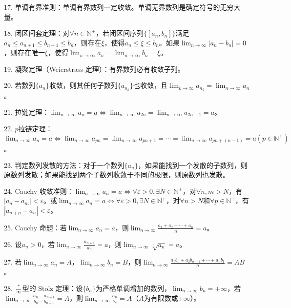 \documentclass[UTF8]{ctexart}
\theoremstyle{remark}
\begin{document}
	17. 单调有界准则：单调有界数列一定收敛。单调无界数列是确定符号的无穷大量。
	
	18. 闭区间套定理：对\(\forall n\in\mathbb{N}^+\)，若闭区间序列\(\{[a_n,b_n]\}\)满足\(a_n\leq a_{n + 1}\leq b_{n + 1}\leq b_n\)，则存在\(\xi\)，使得\(a_n\leq\xi\leq b_n\)。如果\(\lim_{n\rightarrow\infty}|a_n - b_n| = 0\)，则存在唯一\(\xi\)，使得\(\lim_{n\rightarrow\infty}a_n = \lim_{n\rightarrow\infty}b_n = \xi\)。
	
	19. 凝聚定理（Weierstrass 定理）：有界数列必有收敛子列。
	
	20. 若数列\(\{a_n\}\)收敛，则其任何子数列\(\{a_{n_k}\}\)也收敛，且\(\lim_{k\rightarrow\infty}a_{n_k} = \lim_{n\rightarrow\infty}a_n\)。
	
	21. 拉链定理：\(\lim_{n\rightarrow\infty}a_n = a\Leftrightarrow\lim_{n\rightarrow\infty}a_{2n} = \lim_{n\rightarrow\infty}a_{2n + 1} = a\)。
	
	22. \(p\)拉链定理：\(\lim_{n\rightarrow\infty}a_n = a\Leftrightarrow\lim_{n\rightarrow\infty}a_{pn} = \lim_{n\rightarrow\infty}a_{pn + 1} = \cdots = \lim_{n\rightarrow\infty}a_{pn + (n - 1)} = a(p\in\mathbb{N}^+)\)。
	
	23. 判定数列发散的方法：对于一个数列\(\{a_n\}\)，如果能找到一个发散的子数列，则原数列发散；如果能找到两个子数列收敛于不同的极限，则原数列也发散。
	
	24. Cauchy 收敛准则：\(\lim_{n\rightarrow\infty}a_n = a\Leftrightarrow\forall\varepsilon>0,\exists N\in\mathbb{N}^+\)，对\(\forall n,m > N\)，有\(|a_n - a_m| < \varepsilon\)。或\(\lim_{n\rightarrow\infty}a_n = a\Leftrightarrow\forall\varepsilon>0,\exists N\in\mathbb{N}^+\)，对\(\forall n > N\)和\(\forall p\in\mathbb{N}^+\)，有\(|a_{n + p} - a_n| < \varepsilon\)。
	
	25. Cauchy 命题：若\(\lim_{n\rightarrow\infty}a_n = a\)，则\(\lim_{n\rightarrow\infty}\frac{a_1 + a_2 + \cdots + a_n}{n}=a\)。
	
	26. 设\(a_n>0\)，若\(\lim_{n\rightarrow\infty}\frac{a_{n + 1}}{a_n}=a\)，则\(\lim_{n\rightarrow\infty}\sqrt[n]{a_n}=a\)。
	
	27. 若\(\lim_{n\rightarrow\infty}a_n = A\)，\(\lim_{n\rightarrow\infty}b_n = B\)，则\(\lim_{n\rightarrow\infty}\frac{a_1b_n + a_2b_{n - 1} + \cdots + a_nb_1}{n}=AB\)。
	
	28. \(\frac{*}{\infty}\)型的 Stolz 定理：设\(\{b_n\}\)为严格单调增加的数列，\(\lim_{n\rightarrow\infty}b_n = +\infty\)，若\(\lim_{n\rightarrow\infty}\frac{a_n - a_{n - 1}}{b_n - b_{n - 1}} = A\)，则\(\lim_{n\rightarrow\infty}\frac{a_n}{b_n}=A\)（\(A\)为有限数或\(\pm\infty\)）。
	
\end{document}

